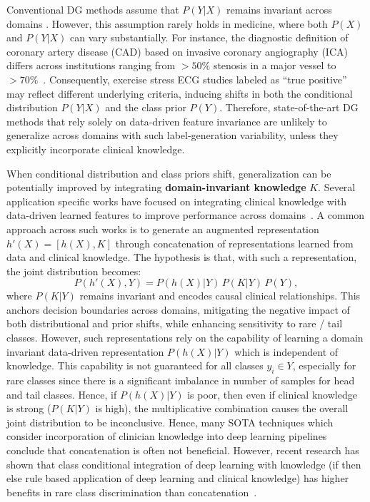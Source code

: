 \documentclass[runningheads]{llncs}
\begin{document}
Conventional DG methods assume that \(P(Y|X)\) remains invariant across domains \cite{li2018domain}. However, this assumption rarely holds in medicine, where both \(P(X)\) and \(P(Y|X)\) can vary substantially. For instance, the diagnostic definition of coronary artery disease (CAD) based on invasive coronary angiography (ICA) differs across institutions ranging from $>50\%$ stenosis in a major vessel to $>70\%$~\cite{vazquez2024clinical}. Consequently, exercise stress ECG studies labeled as “true positive” may reflect different underlying criteria, inducing shifts in both the conditional distribution $P(Y|X)$ and the class prior $P(Y)$. Therefore, state-of-the-art DG methods that rely solely on data-driven feature invariance are unlikely to generalize across domains with such label-generation variability, unless they explicitly incorporate clinical knowledge. 

When conditional distribution and class priors shift, generalization can be potentially improved by integrating \textbf{domain-invariant knowledge} \(K\). Several application specific works have focused on integrating clinical knowledge with data-driven learned features to improve performance across domains~\cite{Wong22, Hohn21_Cancer, Gessert20, Tschandl23, Hohn21_JMIR}. A common approach across such works is to generate an augmented representation \(h'(X) = [h(X), K]\) through concatenation of representations learned from data and clinical knowledge. The hypothesis is that, with such a representation, the joint distribution becomes: \[P(h'(X), Y) = P(h(X)|Y) \, P(K|Y) \, P(Y),\] where \(P(K|Y)\) remains invariant and encodes causal clinical relationships. This anchors decision boundaries across domains, mitigating the negative impact of both distributional and prior shifts, while enhancing sensitivity to rare / tail classes. However, such representations rely on the capability of learning a domain invariant data-driven representation $P(h(X)|Y)$ which is independent of knowledge. This capability is not guaranteed for all classes $y_i \in Y$, especially for rare classes since there is a significant imbalance in number of samples for head and tail classes. Hence, if $P(h(X)|Y)$ is poor, then even if clinical knowledge is strong ($P(K|Y)$ is high), the multiplicative combination causes the overall joint distribution to be inconclusive. Hence, many SOTA techniques which consider incorporation of clinician knowledge into deep learning pipelines conclude that concatenation is often not beneficial\cite{Wong22, Hohn21_Cancer, Gessert20, Tschandl23, Hohn21_JMIR}. However, recent research has shown that class conditional integration of deep learning with knowledge (if then else rule based application of deep learning and clinical knowledge) has higher benefits in rare class discrimination than concatenation~\cite{Hohn21_Cancer,banerjee2023automated,kamboj2024expert,kamboj2024expertTAI}.   
\end{document}
